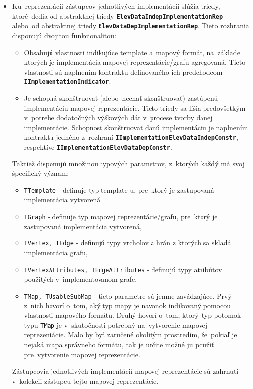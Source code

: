 \begin{itemize}
    \item Ku~reprezentácii zástupcov jednotlivých implementácií slúžia triedy, ktoré~dedia od abstraktnej triedy \textbf{\texttt{ElevDataIndepImplementationRep}} alebo~od abstraktnej triedy \textbf{\texttt{ElevDataDepImplementationRep}}. Tieto rozhrania disponujú dvojitou funkcionalitou:
    \begin{itemize}
        \item Obsahujú vlastnosti indikujúce template a~mapový formát, na~základe ktorých je implementácia mapovej reprezentácie/grafu agregovaná. Tieto vlastnosti sú naplnením kontraktu definovaného ich predchodcom \textbf{\texttt{IImplementationIndicator}}.
        \item Je schopná skonštruovať (alebo~nechať skonštruovať) zastúpenú implementáciu mapovej reprezentácie. Tieto triedy sa líšia predovšetkým v~potrebe dodatočných výškových dát v~procese tvorby danej implementácie. Schopnosť skonštruovať danú implementáciu je naplnením kontraktu jedného z~rozhraní \textbf{\texttt{IImplementationElevDataIndepConstr}}, respektíve \textbf{\texttt{IImplementationElevDataDepConstr}}. 
    \end{itemize}
    Taktiež disponujú množinou typových parametrov, z~ktorých každý má svoj špecifický význam:
    \begin{itemize}
        \item \texttt{TTemplate} - definuje typ template-u, pre~ktorý je zastupovaná implementácia vytvorená,
        \item \texttt{TGraph} - definuje typ mapovej reprezentácie/grafu, pre~ktorý je zastupovaná implementácia vytvorená,
        \item \texttt{TVertex, TEdge} - definujú typy vrcholov a hrán z ktorých sa skladá implementácia grafu,
        \item \texttt{TVertexAttributes, TEdgeAttributes} - definujú typy atribútov použitých v~implementovanom grafe,
        \item \texttt{TMap, TUsableSubMap} - tieto parametre sú jemne zavádzajúce. Prvý z~nich hovorí o~tom, aký typ mapy je navonok indikovaný pomocou vlastnosti mapového formátu. Druhý hovorí o~tom, ktorý~typ potomok typu \texttt{TMap} je v~skutočnosti potrebný na~vytvorenie mapovej reprezentácie. Malo by byť zaručené okolitým prostredím, že~pokiaľ je nejaká mapa správneho formátu, tak je určite možné ju použiť pre~vytvorenie mapovej reprezentácie. 
    \end{itemize}
    
    Zástupcovia jednotlivých implementácií mapovej reprezentácie sú zahrnutí v~kolekcii zástupcu tejto mapovej reprezentácie.

\end{itemize}

